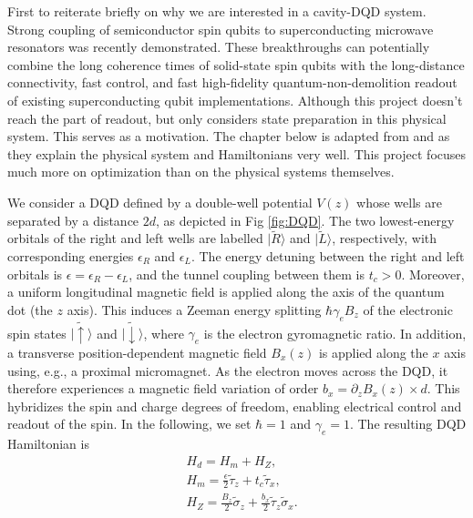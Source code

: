 \documentclass[12pt]{report}
\begin{document}
First to reiterate briefly on why we are interested in a cavity-DQD system. Strong coupling of semiconductor spin qubits to superconducting microwave resonators was recently demonstrated. \cite{Mi2018}\cite{Landig2018}
These breakthroughs can potentially combine the long coherence times of solid-state spin qubits with the long-distance connectivity, fast control, and fast high-fidelity quantum-non-demolition readout of existing superconducting qubit implementations.\cite{D_Anjou_2019}
Although this project doesn't reach the part of readout, but only considers state preparation in this physical system. This serves as a motivation. 
The chapter below is adapted from \cite{D_Anjou_2019} and \cite{reinhold2019} as they explain the physical system and Hamiltonians very well. 
This project focuses much more on optimization than on the physical systems themselves.
\par
We consider a DQD defined by a double-well potential $V(z)$ whose wells are separated by a distance $2d$, as depicted in Fig \ref{fig:DQD}.
The two lowest-energy orbitals of the right and left wells are labelled $|\widetilde{R}\rangle$ and $|\widetilde{L}\rangle$, respectively, with corresponding energies $\epsilon_R$ and $\epsilon_L$.
The energy detuning between the right and left orbitals is $\epsilon=\epsilon_R-\epsilon_L$, and the tunnel coupling between them is $t_c>0$. 
Moreover, a uniform longitudinal magnetic field is applied along the axis of the quantum dot (the $z$ axis). This induces a Zeeman energy splitting $\hbar \gamma_e B_z$ of the electronic spin states $|\widetilde{\uparrow}\rangle$ and $|\widetilde{\downarrow}\rangle$, where $\gamma_e$ is the electron gyromagnetic ratio. 
In addition, a transverse position-dependent magnetic field $B_x(z)$ is applied along the $x$ axis using, e.g., a proximal micromagnet. As the electron moves across the DQD, it therefore experiences a magnetic field variation of order $b_x=\partial_z B_x(z) \times d$. This hybridizes the spin and charge degrees of freedom, enabling electrical control and readout of the spin. 
In the following, we set $\hbar=1$ and $\gamma_e=1$. The resulting DQD Hamiltonian is
\begin{equation}\label{eq:DQD_Hamiltonian}
    \begin{aligned} 
        & H_d=H_m+H_Z, \\
        & H_m=\frac{\epsilon}{2} \widetilde{\tau}_z+t_c \widetilde{\tau}_x, \\
        & H_Z=\frac{B_z}{2} \widetilde{\sigma}_z+\frac{b_x}{2} \widetilde{\tau}_z \widetilde{\sigma}_x .
    \end{aligned}    
\end{equation}
\end{document}
